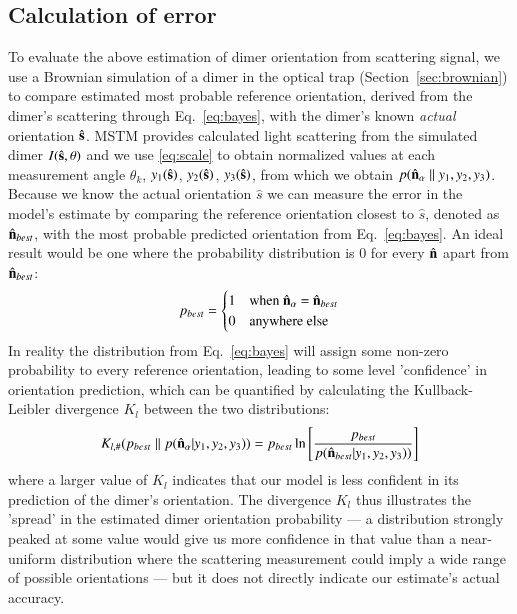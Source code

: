 \documentclass[final,  3p]{elsarticle}
\begin{document}
\subsection{Calculation of error}
\label{sec:divergence}
To evaluate the above estimation of dimer orientation from scattering signal, we use a Brownian simulation of a dimer in the optical trap (Section~\ref{sec:brownian}) to compare estimated most probable reference orientation, derived from the dimer's scattering through Eq.~\eqref{eq:bayes}, with the dimer's known \emph{actual} orientation $\hat{\bf s}$. MSTM provides calculated light scattering from the simulated dimer $I(\hat{\bf s}, \theta)$ and we use \eqref{eq:scale} to obtain normalized values at each measurement angle $\theta_k$,  $y_1(\hat{\bf s})$, $y_2(\hat{\bf s})$, $y_3(\hat{\bf s})$, from which we obtain $p(\hat{\bf n}_{\alpha}\parallel y_1, y_2, y_3)$. Because we know the actual orientation $\hat{s}$ we can measure the error in the model's estimate by comparing the reference orientation closest to $\hat{s}$, denoted as $\hat{\bf n}_{best}$, with the most probable predicted orientation from Eq.~\eqref{eq:bayes}. An ideal result would be one where the probability distribution is 0 for every $\hat{\bf n}$ apart from $\hat{\bf n}_{best}$:
\begin{align}
	\label{eq:best}
	p_{best} = 
	\begin{cases}
		1 & \text{when $\hat{\bf n}_\alpha$ = $\hat{\bf n}_{best}$}\\
		0 & \text{anywhere else}
	\end{cases}
\end{align}
In reality the distribution from Eq.~\eqref{eq:bayes} will assign some non-zero
probability to every reference orientation, leading to some level 'confidence' in orientation prediction, which can be quantified by calculating the Kullback-Leibler divergence $K_l$ between the two distributions:
\begin{align}
	K_{l, \#}(p_{best}\parallel p(\hat{\bf n}_\alpha| y_1, y_2, y_3))
	= p_{best}\ln \left[\frac{p_{best}}{p(\hat{\bf n}_{best}| y_1,y_2,y_3))}
	\right]
	\label{eq;kullback}
\end{align}
where a larger value of $K_l$ indicates that our model is less confident in its
prediction of the dimer's orientation. The divergence $K_l$ thus illustrates the 'spread'
in the estimated dimer orientation probability --- a distribution strongly peaked at 
some value would give us more confidence in that value than a near-uniform distribution 
where the scattering measurement could imply a wide range of possible orientations --- 
but it does not directly indicate our estimate's actual accuracy. 
\end{document}
